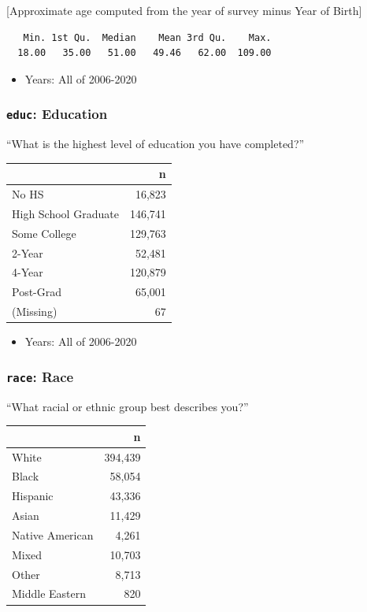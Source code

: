 \documentclass[10pt,article,oneside]{memoir}
\theoremstyle{definition}
\begin{document}
{[}Approximate age computed from the year of survey minus Year of
Birth{]}

\begin{verbatim}
   Min. 1st Qu.  Median    Mean 3rd Qu.    Max. 
  18.00   35.00   51.00   49.46   62.00  109.00 
\end{verbatim}

\begin{itemize}
\tightlist
\item
  Years: All of 2006-2020
\end{itemize}

\hypertarget{educ-education}{%
\subsubsection{\texorpdfstring{\texttt{educ}:
Education}{educ: Education}}\label{educ-education}}

``What is the highest level of education you have completed?''

\begin{table}[H]
\centering
\begin{tabular}{lr}
\toprule
 & n\\
\midrule
No HS & 16,823\\
High School Graduate & 146,741\\
Some College & 129,763\\
2-Year & 52,481\\
4-Year & 120,879\\
Post-Grad & 65,001\\
(Missing) & 67\\
\bottomrule
\end{tabular}
\end{table}

\begin{itemize}
\tightlist
\item
  Years: All of 2006-2020
\end{itemize}

\hypertarget{race-race}{%
\subsubsection{\texorpdfstring{\texttt{race}:
Race}{race: Race}}\label{race-race}}

``What racial or ethnic group best describes you?''

\begin{table}[H]
\centering
\begin{tabular}{lr}
\toprule
 & n\\
\midrule
White & 394,439\\
Black & 58,054\\
Hispanic & 43,336\\
Asian & 11,429\\
Native American & 4,261\\
Mixed & 10,703\\
Other & 8,713\\
Middle Eastern & 820\\
\bottomrule
\end{tabular}
\end{table}
\end{document}
